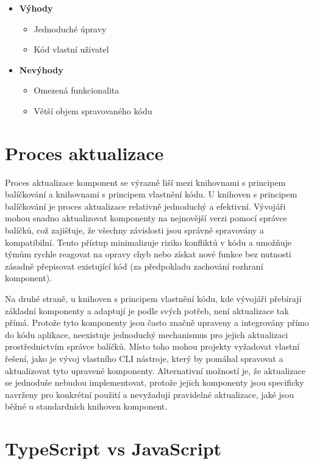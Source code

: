 \begin{itemize}
    \item \textbf{Výhody}
    \begin{itemize}
        \item Jednoduché úpravy
        \item Kód vlastní uživatel
    \end{itemize}
    \item \textbf{Nevýhody}
    \begin{itemize}
        \item Omezená funkcionalita
        \item Větší objem spravovaného kódu
    \end{itemize}
\end{itemize}

\section{Proces aktualizace}
Proces aktualizace komponent se výrazně liší mezi knihovnami s principem balíčkování a knihovnami s principem vlastnění kódu. U knihoven s principem balíčkování je proces aktualizace relativně jednoduchý a efektivní. Vývojáři mohou snadno aktualizovat komponenty na nejnovější verzi pomocí správce balíčků, což zajišťuje, že všechny závislosti jsou správně spravovány a kompatibilní. Tento přístup minimalizuje riziko konfliktů v kódu a umožňuje týmům rychle reagovat na opravy chyb nebo získat nové funkce bez nutnosti zásadně přepisovat existující kód (za předpokladu zachování rozhraní komponent).

Na druhé straně, u knihoven s principem vlastnění kódu, kde vývojáři přebírají základní komponenty a adaptují je podle svých potřeb, není aktualizace tak přímá. Protože tyto komponenty jsou často značně upraveny a integrovány přímo do kódu aplikace, neexistuje jednoduchý mechanismus pro jejich aktualizaci prostřednictvím správce balíčků. Místo toho mohou projekty vyžadovat vlastní řešení, jako je vývoj vlastního CLI nástroje, který by pomáhal spravovat a aktualizovat tyto upravené komponenty. Alternativní možností je, že aktualizace se jednoduše nebudou implementovat, protože jejich komponenty jsou specificky navrženy pro konkrétní použití a nevyžadují pravidelné aktualizace, jaké jsou běžné u standardních knihoven komponent.

\section{TypeScript vs JavaScript}

